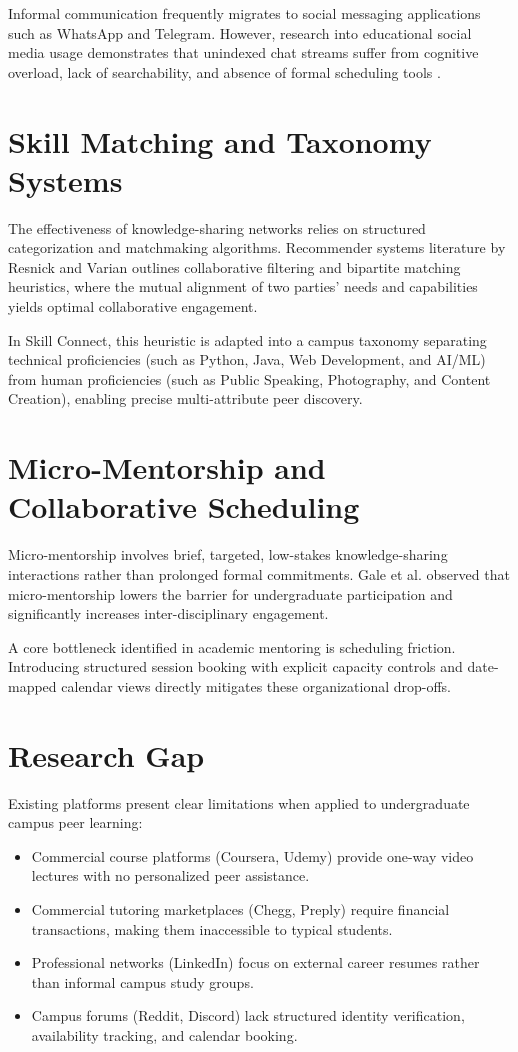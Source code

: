 \documentclass[12pt,a4paper]{report}
\begin{document}
Informal communication frequently migrates to social messaging applications such as WhatsApp and Telegram. However, research into educational social media usage demonstrates that unindexed chat streams suffer from cognitive overload, lack of searchability, and absence of formal scheduling tools \cite{tang2017students}.

\section{Skill Matching and Taxonomy Systems}
The effectiveness of knowledge-sharing networks relies on structured categorization and matchmaking algorithms. Recommender systems literature by Resnick and Varian \cite{resnick1997recommender} outlines collaborative filtering and bipartite matching heuristics, where the mutual alignment of two parties' needs and capabilities yields optimal collaborative engagement.

In Skill Connect, this heuristic is adapted into a campus taxonomy separating technical proficiencies (such as Python, Java, Web Development, and AI/ML) from human proficiencies (such as Public Speaking, Photography, and Content Creation), enabling precise multi-attribute peer discovery.

\section{Micro-Mentorship and Collaborative Scheduling}
Micro-mentorship involves brief, targeted, low-stakes knowledge-sharing interactions rather than prolonged formal commitments. Gale et al. \cite{gale2020micro} observed that micro-mentorship lowers the barrier for undergraduate participation and significantly increases inter-disciplinary engagement.

A core bottleneck identified in academic mentoring is scheduling friction. Introducing structured session booking with explicit capacity controls and date-mapped calendar views directly mitigates these organizational drop-offs.

\section{Research Gap}
Existing platforms present clear limitations when applied to undergraduate campus peer learning:
\begin{itemize}
    \item Commercial course platforms (Coursera, Udemy) provide one-way video lectures with no personalized peer assistance.
    \item Commercial tutoring marketplaces (Chegg, Preply) require financial transactions, making them inaccessible to typical students.
    \item Professional networks (LinkedIn) focus on external career resumes rather than informal campus study groups.
    \item Campus forums (Reddit, Discord) lack structured identity verification, availability tracking, and calendar booking.
\end{itemize}
\end{document}
